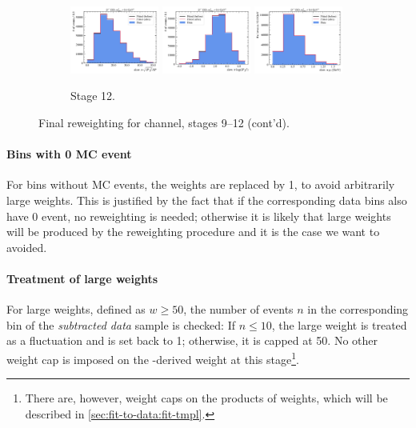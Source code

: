 \begin{figure}[htb]
    \begin{subfigure}{\textwidth}
        \centering
        \includegraphics[width=0.32\textwidth]{./figs-mc-correction/reweighting-final/plot_step12-Dst_iso-spi_comp.pdf}
        \includegraphics[width=0.32\textwidth]{./figs-mc-correction/reweighting-final/plot_step12-Dst_iso-spi_log_ip_chi2.pdf}
        \includegraphics[width=0.32\textwidth]{./figs-mc-correction/reweighting-final/plot_step12-Dst_iso-spi_pt.pdf}
        \caption{Stage 12.}
    \end{subfigure}

    \caption[]{Final reweighting for \Dstar channel, stages 9--12 (cont'd).}
\end{figure}

\paragraph{Bins with 0 MC event} For bins without MC events,
the weights are replaced by 1, to avoid arbitrarily large weights.
This is justified by the fact that if the corresponding data bins also have
0 event, no reweighting is needed;
otherwise it is likely that large weights will be produced by the reweighting
procedure and it is the case we want to avoided.

\paragraph{Treatment of large weights}
For large weights, defined as $w \geq 50$, the number of events $n$
in the corresponding bin of the \emph{subtracted data} sample is checked:
If $n \leq 10$, the large weight is treated as a fluctuation and is
set back to 1;
otherwise, it is capped at 50.
No other weight cap is imposed on the \jpsi\kaon-derived weight at this
stage\footnote{
    There are, however, weight caps on the products of weights,
    which will be described in
    \cref{sec:fit-to-data:fit-tmpl}.
}.

